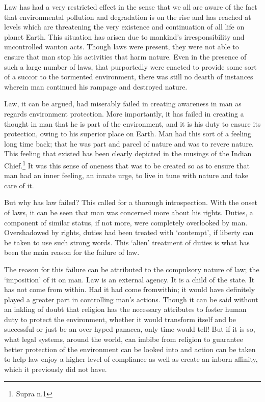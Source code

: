 \begin{multicols}{2}
\noi
Law has had a very restricted effect in the sense that we all are aware of the fact that
environmental pollution and degradation is on the rise and has reached at levels which are
threatening the very existence and continuation of all life on planet Earth. This situation has
arisen due to mankind’s irresponsibility and uncontrolled wanton acts. Though laws were
present, they were not able to ensure that man stop his activities that harm nature. Even in the
presence of such a large number of laws, that purportedly were enacted to provide some sort
of a succor to the tormented environment, there was still no dearth of instances wherein man
continued his rampage and destroyed nature.

\noi
Law, it can be argued, had miserably failed in creating awareness in man as regards
environment protection. More importantly, it has failed in creating a thought in man that he is
part of the environment, and it is his duty to ensure its protection, owing to his superior place
on Earth. Man had this sort of a feeling long time back; that he was part and parcel of nature
and was to revere nature. This feeling that existed has been clearly depicted in the musings of
the Indian Chief.\footnote{Supra n.1} It was this sense of oneness that was to be created so as to ensure that man
had an inner feeling, an innate urge, to live in tune with nature and take care of it.

\noi
But why has law failed? This called for a thorough introspection. With the onset of laws, it
can be seen that man was concerned more about his rights. Duties, a component of similar
status, if not more, were completely overlooked by man. Overshadowed by rights, duties had
been treated with ‘contempt’, if liberty can be taken to use such strong words. This ‘alien’
treatment of duties is what has been the main reason for the failure of law.

\noi
The reason for this failure can be attributed to the compulsory nature of law; the ‘imposition’
of it on man. Law is an external agency. It is a child of the state. It has not come from within.
Had it had come fromwithin; it would have definitely played a greater part in controlling man’s
actions. Though it can be said without an inkling of doubt that religion has the necessary
attributes to foster human duty to protect the environment, whether it would transform itself
and be successful or just be an over hyped panacea, only time would tell! But if it is so, what
legal systems, around the world, can imbibe from religion to guarantee better protection of the
environment can be looked into and action can be taken to help law enjoy a higher level of
compliance as well as create an inborn affinity, which it previously did not have.


\end{multicols}
